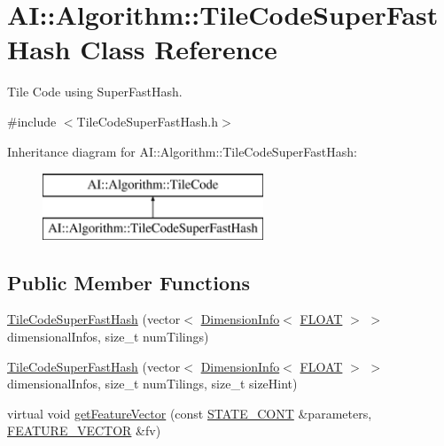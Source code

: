 \hypertarget{classAI_1_1Algorithm_1_1TileCodeSuperFastHash}{\section{A\+I\+:\+:Algorithm\+:\+:Tile\+Code\+Super\+Fast\+Hash Class Reference}
\label{classAI_1_1Algorithm_1_1TileCodeSuperFastHash}
}


Tile Code using Super\+Fast\+Hash.  




{\ttfamily \#include $<$Tile\+Code\+Super\+Fast\+Hash.\+h$>$}

Inheritance diagram for A\+I\+:\+:Algorithm\+:\+:Tile\+Code\+Super\+Fast\+Hash\+:\begin{figure}[H]
\begin{center}
\leavevmode
\includegraphics[height=2.000000cm]{classAI_1_1Algorithm_1_1TileCodeSuperFastHash}
\end{center}
\end{figure}
\subsection*{Public Member Functions}
\begin{DoxyCompactItemize}
\item 
\hyperlink{classAI_1_1Algorithm_1_1TileCodeSuperFastHash_a7538ed36cf8ae0a15ff4c902a335266b}{Tile\+Code\+Super\+Fast\+Hash} (vector$<$ \hyperlink{classAI_1_1Algorithm_1_1DimensionInfo}{Dimension\+Info}$<$ \hyperlink{namespaceAI_a41b74884a20833db653dded3918e05c3}{F\+L\+O\+A\+T} $>$ $>$ dimensional\+Infos, size\+\_\+t num\+Tilings)
\item 
\hyperlink{classAI_1_1Algorithm_1_1TileCodeSuperFastHash_a724f6d6f40f0f8f2e4d4692eb3f6c09f}{Tile\+Code\+Super\+Fast\+Hash} (vector$<$ \hyperlink{classAI_1_1Algorithm_1_1DimensionInfo}{Dimension\+Info}$<$ \hyperlink{namespaceAI_a41b74884a20833db653dded3918e05c3}{F\+L\+O\+A\+T} $>$ $>$ dimensional\+Infos, size\+\_\+t num\+Tilings, size\+\_\+t size\+Hint)
\item 
virtual void \hyperlink{classAI_1_1Algorithm_1_1TileCodeSuperFastHash_a46f0df02799eb67bc8fb574b265e7e67}{get\+Feature\+Vector} (const \hyperlink{namespaceAI_aff63ec21d97dd5f086fddbc3103f5707}{S\+T\+A\+T\+E\+\_\+\+C\+O\+N\+T} \&parameters, \hyperlink{namespaceAI_a23a39e1b301a5c1345fa508796940631}{F\+E\+A\+T\+U\+R\+E\+\_\+\+V\+E\+C\+T\+O\+R} \&fv)
\end{DoxyCompactItemize}
